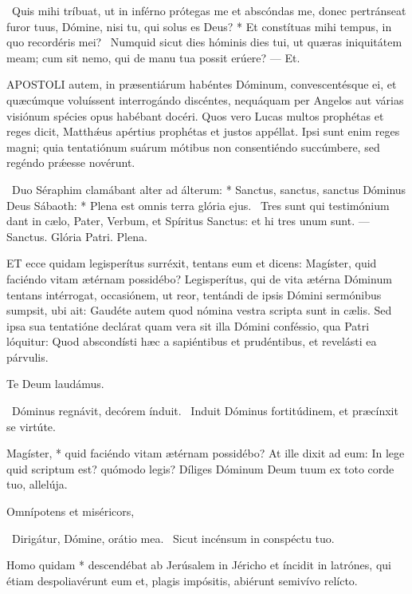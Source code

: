 \R\ Quis mihi tríbuat, ut in inférno prótegas me et abscóndas me, donec pertránseat furor tuus, Dómine, nisi tu, qui solus es Deus? * Et constítuas mihi tempus, in quo recordéris mei? \V\ Numquid sicut dies hóminis dies tui, ut quæras iniquitátem meam; cum sit nemo, qui de manu tua possit erúere? — Et.


\lettrine[lines=2]{A}{POSTOLI} autem, in præsentiárum habéntes Dóminum, convescentésque ei, et quæcúmque voluíssent interrogándo discéntes, nequáquam per Angelos aut várias visiónum spécies opus habébant docéri. Quos vero Lucas multos prophétas et reges dicit, Matthǽus apértius prophétas et justos appéllat. Ipsi sunt enim reges magni; quia tentatiónum suárum mótibus non consentiéndo succúmbere, sed regéndo prǽesse novérunt.

\R\ Duo Séraphim clamábant alter ad álterum: * Sanctus, sanctus, sanctus Dóminus Deus Sábaoth: * Plena est omnis terra glória ejus. \V\ Tres sunt qui testimónium dant in cælo, Pater, Verbum, et Spíritus Sanctus: et hi tres unum sunt. — Sanctus. Glória Patri. Plena.


\lettrine[lines=2]{E}{T} ecce quidam legisperítus surréxit, tentans eum et dicens: Magíster, quid faciéndo vitam ætérnam possidébo? Legisperítus, qui de vita ætérna Dóminum tentans intérrogat, occasiónem, ut reor, tentándi de ipsis Dómini sermónibus sumpsit, ubi ait: Gaudéte autem quod nómina vestra scripta sunt in cælis. Sed ipsa sua tentatióne declárat quam vera sit illa Dómini conféssio, qua Patri lóquitur: Quod abscondísti hæc a sapiéntibus et prudéntibus, et revelásti ea párvulis.

Te Deum laudámus.


\V\ Dóminus regnávit, decórem índuit. \R\ Induit Dóminus fortitúdinem, et præcínxit se virtúte.

 Magíster, * quid faciéndo vitam ætérnam possidébo? At ille dixit ad eum: In lege quid scriptum est? quómodo legis? Díliges Dóminum Deum tuum ex toto corde tuo, allelúja.

 Omnípotens et miséricors, 


\V\ Dirigátur, Dómine, orátio mea. \R\ Sicut incénsum in conspéctu tuo.

 Homo quidam * descendébat ab Jerúsalem in Jéricho et íncidit in latrónes, qui étiam despoliavérunt eum et, plagis impósitis, abiérunt semivívo relícto.

